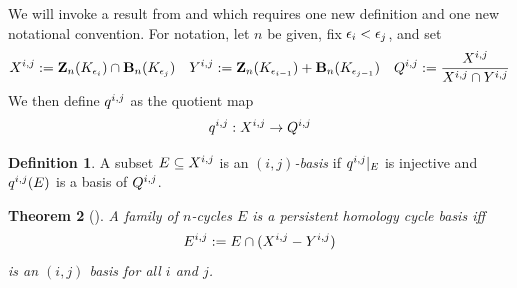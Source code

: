 \documentclass[11pt,onecolumn]{article}
\newtheorem{theorem}{Theorem}[section] %
\newtheorem{lemma}[theorem]{Lemma}
\newenvironment{proof}{{\em Proof:}}{\hfill{\hfill\rule{2mm}{2mm}}}
\newcommand{\Boundaries}[0]{\mathbf{B}}
\newcommand{\Cycles}[0]{\mathbf{Z}}
\newcommand{\optimalrep}{\mathbf{x}}
\newcommand{\cycle}{{\mathbf z}}
\theoremstyle{plain}
\theoremstyle{definition}
\newtheorem{definition}[theorem]{Definition}
\begin{document}
We will invoke a result from \cite{eirene} and \cite{henselman2017} which requires one new definition and one new notational convention.  For notation, let $n$ be given, fix ${\epsilon_i} < {\epsilon_j}$, and set
    \begin{align*}
        \xij: = \Cycles_n(K_\ei) \cap \Boundaries_n(K_\ej)
        &&
        \yij: = \Cycles_n(K_\eineg) + \Boundaries_n(K_\ejneg)
        &&
        \Qij: = \frac{\xij}{\xij \cap \yij}
    \end{align*}
We then define $q^{i, j}$ as the quotient map 
    \begin{align*}
        \qij:   \xij \to \Qij %
    \end{align*}


\begin{definition}
A subset $E \subseteq X^{i, j}$  is an \emph{$(i,j)$-basis} if $q^{i, j}|_E$ is injective and $q^{i, j}(E)$ is a basis of $Q^{i,j}$.  
\end{definition}







\begin{theorem}[\cite{eirene, henselman2017}]
\label{thm:phindependencecharacterization}
A family of $n$-cycles $E$ is a persistent homology cycle basis iff
    \begin{align*}
        E^{i,j} := E \cap (X^{i, j} - Y^{i, j})
    \end{align*}
is an $(i,j)$ basis for all $i$ and $j$.
\end{theorem}
\end{document}
